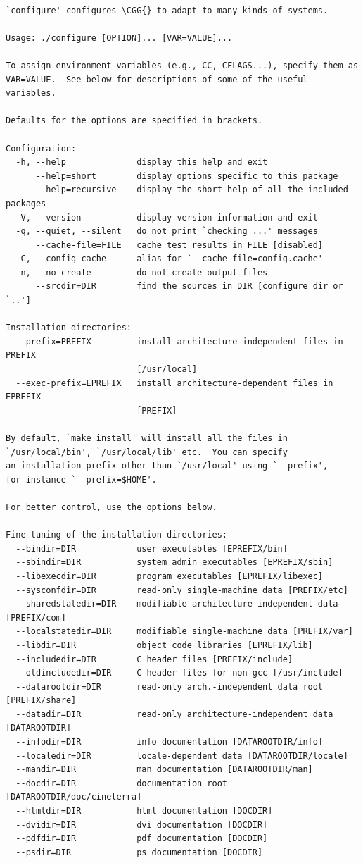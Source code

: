 \begin{verbatim}

`configure' configures \CGG{} to adapt to many kinds of systems.

Usage: ./configure [OPTION]... [VAR=VALUE]...

To assign environment variables (e.g., CC, CFLAGS...), specify them as
VAR=VALUE.  See below for descriptions of some of the useful variables.

Defaults for the options are specified in brackets.

Configuration:
  -h, --help              display this help and exit
      --help=short        display options specific to this package
      --help=recursive    display the short help of all the included packages
  -V, --version           display version information and exit
  -q, --quiet, --silent   do not print `checking ...' messages
      --cache-file=FILE   cache test results in FILE [disabled]
  -C, --config-cache      alias for `--cache-file=config.cache'
  -n, --no-create         do not create output files
      --srcdir=DIR        find the sources in DIR [configure dir or `..']

Installation directories:
  --prefix=PREFIX         install architecture-independent files in PREFIX
                          [/usr/local]
  --exec-prefix=EPREFIX   install architecture-dependent files in EPREFIX
                          [PREFIX]

By default, `make install' will install all the files in
`/usr/local/bin', `/usr/local/lib' etc.  You can specify
an installation prefix other than `/usr/local' using `--prefix',
for instance `--prefix=$HOME'.

For better control, use the options below.

Fine tuning of the installation directories:
  --bindir=DIR            user executables [EPREFIX/bin]
  --sbindir=DIR           system admin executables [EPREFIX/sbin]
  --libexecdir=DIR        program executables [EPREFIX/libexec]
  --sysconfdir=DIR        read-only single-machine data [PREFIX/etc]
  --sharedstatedir=DIR    modifiable architecture-independent data [PREFIX/com]
  --localstatedir=DIR     modifiable single-machine data [PREFIX/var]
  --libdir=DIR            object code libraries [EPREFIX/lib]
  --includedir=DIR        C header files [PREFIX/include]
  --oldincludedir=DIR     C header files for non-gcc [/usr/include]
  --datarootdir=DIR       read-only arch.-independent data root [PREFIX/share]
  --datadir=DIR           read-only architecture-independent data [DATAROOTDIR]
  --infodir=DIR           info documentation [DATAROOTDIR/info]
  --localedir=DIR         locale-dependent data [DATAROOTDIR/locale]
  --mandir=DIR            man documentation [DATAROOTDIR/man]
  --docdir=DIR            documentation root [DATAROOTDIR/doc/cinelerra]
  --htmldir=DIR           html documentation [DOCDIR]
  --dvidir=DIR            dvi documentation [DOCDIR]
  --pdfdir=DIR            pdf documentation [DOCDIR]
  --psdir=DIR             ps documentation [DOCDIR]


\end{verbatim}
